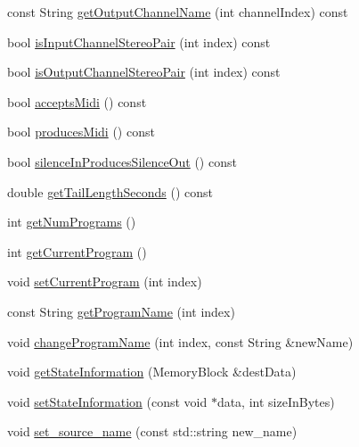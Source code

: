\begin{DoxyCompactItemize}
const String \hyperlink{classSsrSceneAutomationAudioProcessor_a899e7bb0bce22f012243d66bd29e3ccd}{get\-Output\-Channel\-Name} (int channel\-Index) const 
\item 
bool \hyperlink{classSsrSceneAutomationAudioProcessor_a859adec37fe713011e192ff88fd0b114}{is\-Input\-Channel\-Stereo\-Pair} (int index) const 
\item 
bool \hyperlink{classSsrSceneAutomationAudioProcessor_a5b395f466b996f00af891c9b8533011a}{is\-Output\-Channel\-Stereo\-Pair} (int index) const 
\item 
bool \hyperlink{classSsrSceneAutomationAudioProcessor_a4090dee24cd41be3239ba05253860709}{accepts\-Midi} () const 
\item 
bool \hyperlink{classSsrSceneAutomationAudioProcessor_a398a7e53c748edd945533fee4f86a317}{produces\-Midi} () const 
\item 
bool \hyperlink{classSsrSceneAutomationAudioProcessor_a2f4c8b2744ebfc641fed9517016d2fd0}{silence\-In\-Produces\-Silence\-Out} () const 
\item 
double \hyperlink{classSsrSceneAutomationAudioProcessor_af740567e8b2b7f01803ffc6976f84a1b}{get\-Tail\-Length\-Seconds} () const 
\item 
int \hyperlink{classSsrSceneAutomationAudioProcessor_ad34c8255d7e87c287c4d98e6c1b11cd7}{get\-Num\-Programs} ()
\item 
int \hyperlink{classSsrSceneAutomationAudioProcessor_a0671bbc7dcdc68151f227b1cbdd959c9}{get\-Current\-Program} ()
\item 
void \hyperlink{classSsrSceneAutomationAudioProcessor_a3fdc162c554428293320e244601c0286}{set\-Current\-Program} (int index)
\item 
const String \hyperlink{classSsrSceneAutomationAudioProcessor_a32c34f52f18073fe94fcee958c72acb4}{get\-Program\-Name} (int index)
\item 
void \hyperlink{classSsrSceneAutomationAudioProcessor_aabe3213d57ebcd38e916cb4ae7a7a24c}{change\-Program\-Name} (int index, const String \&new\-Name)
\item 
void \hyperlink{classSsrSceneAutomationAudioProcessor_a93f80b21816df0ea3d18f0cda89119b3}{get\-State\-Information} (Memory\-Block \&dest\-Data)
\item 
void \hyperlink{classSsrSceneAutomationAudioProcessor_afc94e90987ec7d2939c74df160d3d752}{set\-State\-Information} (const void $\ast$data, int size\-In\-Bytes)
\item 
void \hyperlink{classSsrSceneAutomationAudioProcessor_aca296d25f3ba295af72df31cd7d30711}{set\-\_\-source\-\_\-name} (const std\-::string new\-\_\-name)

\end{DoxyCompactItemize}
